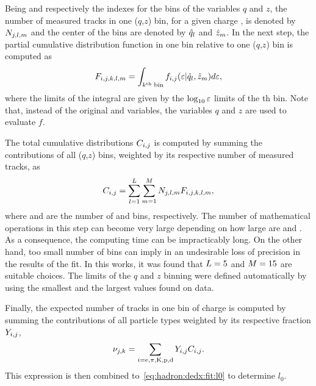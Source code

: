 Being \iq and \iz respectively the indexes for the
bins of the variables $q$ and $z$, the
number of measured tracks in one ($q$,$z$) bin,
for a given charge \ich, is denoted
by $N_{j,l,m}$ and the center of the bins are denoted
by $\hat{q}_{l}$ and $\hat{z}_{m}$. In the next step, the partial
cumulative distribution function in one \ieps bin relative to
one ($q$,$z$) bin is computed as
\begin{equation}
  F_{i,j,k,l,m} = \int_{k^\text{th}\; \text{bin}} f_{i,j}(\mbox{$\varepsilon$}|\hat{q}_{l},\hat{z}_{m}) d\mbox{$\varepsilon$},
\end{equation}
where the limits of the integral are given by the $\log_{10}\mbox{$\varepsilon$}$
limits of the {\ieps}th bin. Note that,
instead of the original \pp and \ncl variables,
the variables $q$ and $z$ are used to evaluate $f$.

The total cumulative distributions $C_{i,j}$ is computed by summing
the contributions of all ($q$,$z$) bins, weighted by its respective
number of measured tracks, as
\begin{equation}
  C_{i,j} = \sum_{l=1}^{L} \sum_{m=1}^{M} N_{j,l,m} F_{i,j,k,l,m},
\end{equation}
where \nq and \nz are the number of \iq and \iz bins, respectively.
The number of mathematical operations in this step
can become very large depending on how large are \nq and \nz.
As a consequence, the computing time can be impracticably long.
On the other hand,
too small number of bins can imply in an undesirable loss of precision
in the results of the fit. In this works,
it was found that $L = 5$ and $M = 15$ are suitable choices.
The limits of the $q$ and $z$ binning were defined automatically
by using the smallest and the largest values found on data.

Finally, the expected number of tracks in one \ieps bin of charge \ich
is computed by summing the contributions of all particle types
weighted by its respective fraction $Y_{i,j}$,
\begin{equation}
  \nu_{j,k} = \sum_{i=\text{e},\pi,\text{K},\text{p},\text{d}} Y_{i,j} C_{i,j}.
  \label{eq:hadron:dedx:fit:exp}
\end{equation}
This expression is then combined to~\cref{eq:hadron:dedx:fit:l0}
to determine $l_0$.

